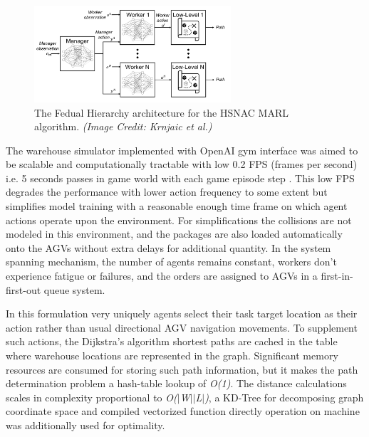 \documentclass{article}
\begin{document}
\begin{figure}[h]
    \centering
    \includegraphics[width=0.65\textwidth]{hsnac-diagram.png}
    \caption{The Fedual Hierarchy architecture for the HSNAC MARL algorithm. \textit{(Image Credit: Krnjaic et al.)}}
    \label{fig:hsnac-dia}
\end{figure}


The warehouse simulator implemented with OpenAI gym interface was aimed to be scalable and computationally tractable with low 0.2 FPS (frames per second) i.e. 5 seconds passes in game world with each game episode step \cite{brockman2016openai}.
This low FPS degrades the performance with lower action frequency to some extent but simplifies model training with a reasonable enough time frame on which agent actions operate upon the environment.
For simplifications the collisions are not modeled in this environment, and the packages are also loaded automatically onto the AGVs without extra delays for additional quantity.
In the system spanning mechanism, the number of agents remains constant, workers don’t experience fatigue or failures, and the orders are assigned to AGVs in a first-in-first-out queue system.


In this formulation very uniquely agents select their task target location as their action rather than usual directional AGV navigation movements.
To supplement such actions, the Dijkstra’s algorithm shortest paths are cached in the table where warehouse locations are represented in the graph.
Significant memory resources are consumed for storing such path information, but it makes the path determination problem a hash-table lookup of \textit{O(1)}.
The distance calculations scales in complexity proportional to \textit{O($|$W$|$$|$L$|$)}, a KD-Tree for decomposing graph coordinate space and compiled vectorized function directly operation on machine was additionally used for optimality.
\end{document}
